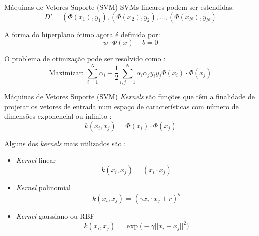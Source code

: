 \begin{frame}{Máquinas de Vetores Suporte (SVM)}
SVMs lineares podem ser estendidas:
\begin{equation*}
    D' = (\Phi(x_1), y_1), (\Phi(x_2), y_2), \ldots, (\Phi(x_N), y_N)
\end{equation*}

A forma do hiperplano ótimo agora é definida por:
\begin{equation*}
w \cdot \Phi(x) + b = 0
\end{equation*}

O problema de otimização pode ser resolvido como \citep{lorena:03}:
\begin{equation*}
\text{Maximizar: } \sum_{i=1}^N \alpha_i - \frac{1}{2} \sum_{i, j=1}^N \alpha_i \alpha_j y_i y_j \Phi(x_i)\cdot \Phi(x_j)
\end{equation*}

\end{frame}

\begin{frame}{Máquinas de Vetores Suporte (SVM)}
\emph{Kernels} são funções que têm a finalidade de projetar os vetores de entrada num espaço de características com número de dimensões exponencial ou infinito \citep{taylor:04}:
\begin{equation*}
k(x_i, x_j) =  \Phi(x_i) \cdot \Phi(x_j)
\end{equation*}

Alguns dos \emph{kernels} mais utilizados são \citep{lorena:03}:
\begin{itemize}
\item \emph{Kernel} linear
\begin{equation*}
k(x_i, x_j) =  (x_i \cdot x_j)
\end{equation*}

\item \emph{Kernel} polinomial
\begin{equation*}
k(x_i, x_j) =  ({\gamma x_i \cdot x_j + r} )^g
\end{equation*}

\item \emph{Kernel} gaussiano ou RBF
\begin{equation*}
k(x_i, x_j) =  \exp{\big(-\gamma {||x_i - x_j||}^2 \big)}
\end{equation*}
\end{itemize}

\end{frame}

